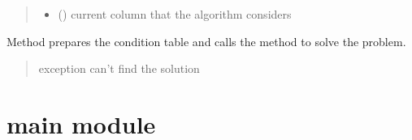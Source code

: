 \documentclass[letterpaper,10pt,english]{sphinxmanual}
\begin{document}
\begin{fulllineitems}
\begin{fulllineitems}
\begin{quote}
\begin{description}
\begin{itemize}
\item {} 
\sphinxAtStartPar
{} () \textendash{} current column that the algorithm considers

\end{itemize}

\end{description}\end{quote}

\end{fulllineitems}


\begin{fulllineitems}
\label{\detokenize{board_resolver:board_resolver.BoardResolver.resolver}}
\pysigstartsignatures
{}
\pysigstopsignatures
\sphinxAtStartPar
Method prepares the condition table and calls
the method to solve the problem.
\begin{quote}\begin{description}
\sphinxAtStartPar
{} \textendash{} exception \sphinxhyphen{} can’t find the solution

\end{description}\end{quote}

\end{fulllineitems}


\end{fulllineitems}


\sphinxstepscope


\section{main module}
\label{\detokenize{main:module-main}}\label{\detokenize{main:main-module}}\label{\detokenize{main::doc}}
\end{document}
